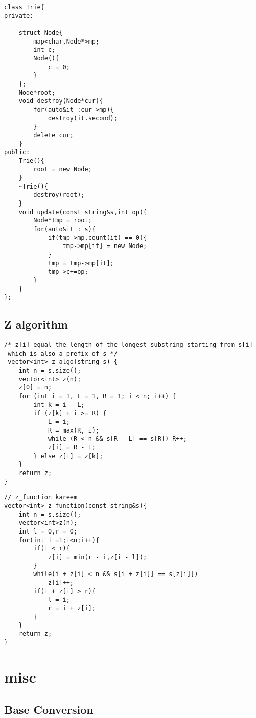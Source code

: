 {\begin{lstlisting}[style=cpp]
class Trie{
private:

    struct Node{
        map<char,Node*>mp;
        int c;
        Node(){
            c = 0;
        }
    };
    Node*root;
    void destroy(Node*cur){
        for(auto&it :cur->mp){
            destroy(it.second);
        }
        delete cur;
    }
public:
    Trie(){
        root = new Node;
    }
    ~Trie(){
        destroy(root);
    }
    void update(const string&s,int op){
        Node*tmp = root;
        for(auto&it : s){
            if(tmp->mp.count(it) == 0){
                tmp->mp[it] = new Node;
            }
            tmp = tmp->mp[it];
            tmp->c+=op;
        }
    }
};
\end{lstlisting}

\subsection{Z algorithm}

\begin{lstlisting}[style=cpp]
/* z[i] equal the length of the longest substring starting from s[i]  
 which is also a prefix of s */
 vector<int> z_algo(string s) {  
    int n = s.size();  
    vector<int> z(n);  
    z[0] = n;  
    for (int i = 1, L = 1, R = 1; i < n; i++) {  
        int k = i - L;  
        if (z[k] + i >= R) {  
            L = i;  
            R = max(R, i);  
            while (R < n && s[R - L] == s[R]) R++;  
            z[i] = R - L;  
        } else z[i] = z[k];  
    }  
    return z;  
}
\end{lstlisting}

\begin{lstlisting}[style=cpp]
// z_function kareem
vector<int> z_function(const string&s){
    int n = s.size();
    vector<int>z(n);
    int l = 0,r = 0;
    for(int i =1;i<n;i++){
        if(i < r){
            z[i] = min(r - i,z[i - l]);
        }
        while(i + z[i] < n && s[i + z[i]] == s[z[i]])
            z[i]++;
        if(i + z[i] > r){
            l = i;
            r = i + z[i];
        }
    }
    return z;
}
\end{lstlisting}

\section{misc}

\subsection{Base Conversion}

}
